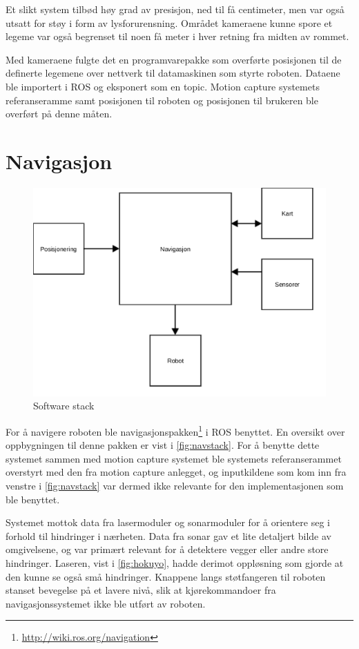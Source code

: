 Et slikt system tilbød høy grad av presisjon, ned til få centimeter, men var også utsatt for støy i form av
lysforurensning. Området kameraene kunne spore et legeme var også
begrenset til noen få meter i hver retning fra midten av rommet.

Med kameraene fulgte det en programvarepakke som overførte posisjonen til de definerte legemene over nettverk
til datamaskinen som styrte roboten. Dataene ble importert i ROS og eksponert
som en topic.  Motion capture systemets
referanseramme samt posisjonen til roboten og posisjonen til brukeren ble overført på denne måten.

\section{Navigasjon}

\begin{figure}[!ht]
  \centering
  \includegraphics[width=\textwidth]{gfx/nav.pdf}
  \caption{Software stack}
  \label{fig:navstack}
\end{figure}

For å navigere roboten ble navigasjonspakken\footnote{\url{http://wiki.ros.org/navigation}} i ROS benyttet.
En oversikt over oppbygningen til denne pakken er vist i \autoref{fig:navstack}.
For å benytte dette systemet sammen med motion capture systemet ble systemets referanserammet overstyrt med den
fra motion capture anlegget, og inputkildene som kom inn fra venstre i \autoref{fig:navstack} var dermed ikke
relevante for den implementasjonen som ble benyttet.

Systemet mottok data fra lasermoduler og sonarmoduler for å orientere seg i forhold til hindringer i nærheten. 
Data fra sonar gav et lite detaljert bilde av omgivelsene, og var primært relevant for å detektere vegger
eller andre store hindringer. Laseren, vist i \autoref{fig:hokuyo}, hadde derimot oppløsning som gjorde at den kunne se også små hindringer. Knappene langs støtfangeren til roboten stanset bevegelse på et lavere nivå, slik at kjørekommandoer fra navigasjonssystemet ikke ble utført av roboten.

